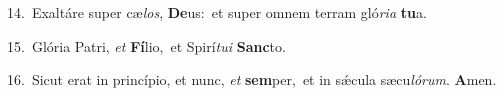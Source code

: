 {\numbfont\textcolor{\numbcolor}{14.}}~Exaltáre super cæ\-\textit{los}\-, \textbf{De}\-us:~\star et super omnem terram gló\-\textit{ri}\-\textit{a} \textbf{tu}\-a.\par
{\numbfont\textcolor{\numbcolor}{15.}}~Glória Patri, \textit{et} \textbf{Fí}\-lio,~\star et Spirí\-\textit{tu}\-\textit{i} \textbf{Sanc}\-to.\par
{\numbfont\textcolor{\numbcolor}{16.}}~Sicut erat in princípio, et nunc, \textit{et} \textbf{sem}\-per,~\star et in sǽcula sæcu\-\textit{ló}\-\textit{rum}. \textbf{A}\-men.\par
